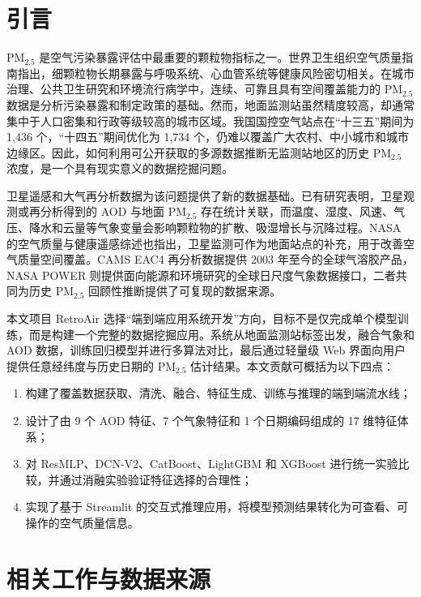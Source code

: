 ﻿\documentclass[UTF8,zihao=-4,a4paper]{ctexart}
\newcommand{\pmfine}{PM$_{2.5}$}
\newcommand{\aod}{AOD}
\begin{document}
\section{引言}

\pmfine{} 是空气污染暴露评估中最重要的颗粒物指标之一。世界卫生组织空气质量指南指出，细颗粒物长期暴露与呼吸系统、心血管系统等健康风险密切相关\cite{who2021}。在城市治理、公共卫生研究和环境流行病学中，连续、可靠且具有空间覆盖能力的 \pmfine{} 数据是分析污染暴露和制定政策的基础。然而，地面监测站虽然精度较高，却通常集中于人口密集和行政等级较高的城市区域。我国国控空气站点在“十三五”期间为 1,436 个，“十四五”期间优化为 1,734 个，仍难以覆盖广大农村、中小城市和城市边缘区\cite{mee2020}。因此，如何利用可公开获取的多源数据推断无监测站地区的历史 \pmfine{} 浓度，是一个具有现实意义的数据挖掘问题。

卫星遥感和大气再分析数据为该问题提供了新的数据基础。已有研究表明，卫星观测或再分析得到的 \aod{} 与地面 \pmfine{} 存在统计关联\cite{xin2016,zheng2017}，而温度、湿度、风速、气压、降水和云量等气象变量会影响颗粒物的扩散、吸湿增长与沉降过程。NASA 的空气质量与健康遥感综述也指出，卫星监测可作为地面站点的补充，用于改善空气质量空间覆盖\cite{holloway2023}。CAMS EAC4 再分析数据提供 2003 年至今的全球气溶胶产品\cite{cams}，NASA POWER 则提供面向能源和环境研究的全球日尺度气象数据接口\cite{nasa_power}，二者共同为历史 \pmfine{} 回顾性推断提供了可复现的数据来源。

本文项目 RetroAir 选择“端到端应用系统开发”方向，目标不是仅完成单个模型训练，而是构建一个完整的数据挖掘应用。系统从地面监测站标签出发，融合气象和 \aod{} 数据，训练回归模型并进行多算法对比，最后通过轻量级 Web 界面向用户提供任意经纬度与历史日期的 \pmfine{} 估计结果。本文贡献可概括为以下四点：

\begin{enumerate}
  \item 构建了覆盖数据获取、清洗、融合、特征生成、训练与推理的端到端流水线；
  \item 设计了由 9 个 \aod{} 特征、7 个气象特征和 1 个日期编码组成的 17 维特征体系；
  \item 对 ResMLP、DCN-V2、CatBoost、LightGBM 和 XGBoost 进行统一实验比较，并通过消融实验验证特征选择的合理性；
  \item 实现了基于 Streamlit 的交互式推理应用，将模型预测结果转化为可查看、可操作的空气质量信息。
\end{enumerate}

\section{相关工作与数据来源}
\end{document}
